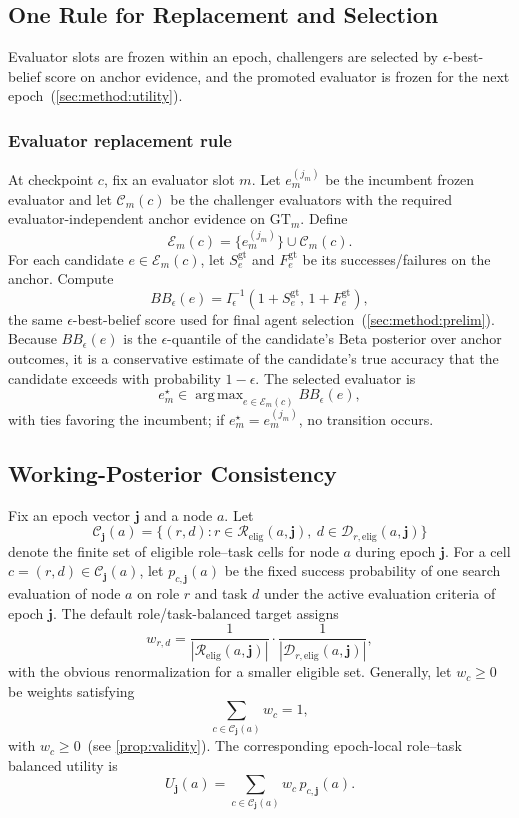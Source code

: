 \documentclass{paper}
\DeclareMathOperator*{\argmax}{arg\,max}
\begin{document}
\subsection{One Rule for Replacement and Selection}
\label{app:controlled_utility_details}

Evaluator slots are frozen within an epoch, challengers are selected by $\epsilon$-best-belief score on anchor evidence, and the promoted evaluator is frozen for the next epoch~(\cref{sec:method:utility}).

\subsubsection{Evaluator replacement rule}
\label{app:swap-rule}

At checkpoint $c$, fix an evaluator slot $m$. Let $e_m^{(j_m)}$ be the incumbent frozen evaluator and let $\mathcal C_m(c)$ be the challenger evaluators with the required evaluator-independent anchor evidence on $\mathrm{GT}_m$. Define
\[
\mathcal E_m(c)
=
\{e_m^{(j_m)}\}\cup\mathcal C_m(c).
\]
For each candidate $e\in\mathcal E_m(c)$, let $S^{\mathrm{gt}}_e$ and $F^{\mathrm{gt}}_e$ be its successes/failures on the anchor. Compute
\[
BB_\epsilon(e)
=
I^{-1}_{\epsilon}\!\left(1+S^{\mathrm{gt}}_e,\,1+F^{\mathrm{gt}}_e\right),
\]
the same $\epsilon$-best-belief score used for final agent selection~(\cref{sec:method:prelim}). Because $BB_\epsilon(e)$ is the $\epsilon$-quantile of the candidate's Beta posterior over anchor outcomes, it is a conservative estimate of the candidate's true accuracy that the candidate exceeds with probability $1-\epsilon$. The selected evaluator is
\[
e_m^\star
\in
\argmax_{e\in\mathcal E_m(c)} BB_\epsilon(e),
\]
with ties favoring the incumbent; if $e_m^\star=e_m^{(j_m)}$, no transition occurs.



\subsection{Working-Posterior Consistency}
\label{app:proofs:role_task_balance}
Fix an epoch vector \(\boldsymbol{j}\) and a node \(a\). Let
\[
\mathcal C_{\boldsymbol{j}}(a)
=
\{(r,d): r\in \mathcal{R}_{\mathrm{elig}}(a,\boldsymbol{j}),\ d\in \mathcal{D}_{r,\mathrm{elig}}(a,\boldsymbol{j})\}
\]
denote the finite set of eligible role--task cells for node \(a\) during epoch \(\boldsymbol{j}\).
For a cell \(c=(r,d)\in \mathcal C_{\boldsymbol{j}}(a)\), let \(p_{c,\boldsymbol{j}}(a)\) be the fixed success
probability of one search evaluation of node \(a\) on role \(r\) and task \(d\)
under the active evaluation criteria of epoch \(\boldsymbol{j}\). The default role/task-balanced target assigns
\[
w_{r,d}
=
\frac{1}{|\mathcal{R}_{\mathrm{elig}}(a,\boldsymbol{j})|}\cdot
\frac{1}{|\mathcal{D}_{r,\mathrm{elig}}(a,\boldsymbol{j})|},
\]
with the obvious renormalization for a smaller eligible set. Generally,
let \(w_c\ge 0\) be weights satisfying
\[
\sum_{c\in \mathcal C_{\boldsymbol{j}}(a)} w_c = 1,
\]
with \(w_c\ge 0\)~(see \cref{prop:validity}).
The corresponding epoch-local role--task balanced utility is
\[
U_{\boldsymbol{j}}(a)
=
\sum_{c\in \mathcal C_{\boldsymbol{j}}(a)} w_c\,p_{c,\boldsymbol{j}}(a).
\]
\end{document}
